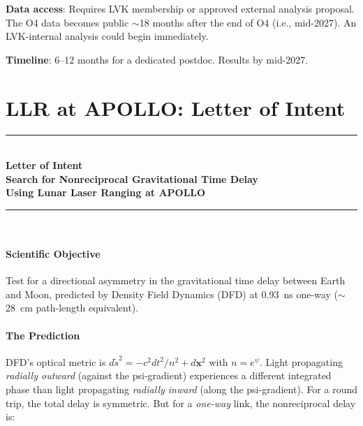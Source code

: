 \documentclass[11pt]{article}
\begin{document}
\textbf{Data access}: Requires LVK membership or approved external
analysis proposal. The O4 data becomes public $\sim$18 months
after the end of O4 (i.e., mid-2027). An LVK-internal analysis
could begin immediately.

\textbf{Timeline}: 6--12 months for a dedicated postdoc. Results
by mid-2027.


\part{LLR at APOLLO: Letter of Intent}
\label{part:llr}

\begin{center}
\rule{\textwidth}{1.5pt}\\[8pt]
{\large \textbf{Letter of Intent}}\\[4pt]
{\large \textbf{Search for Nonreciprocal Gravitational Time Delay}}\\[4pt]
{\large \textbf{Using Lunar Laser Ranging at APOLLO}}\\[8pt]
\rule{\textwidth}{1.5pt}\\[12pt]
\end{center}

\subsection*{Scientific Objective}

Test for a directional asymmetry in the gravitational time delay
between Earth and Moon, predicted by Density Field Dynamics (DFD)
at 0.93~ns one-way ($\sim$28~cm path-length equivalent).

\subsection*{The Prediction}

DFD's optical metric is $d\tilde{s}^2 = -c^2 dt^2/n^2 + d\mathbf{x}^2$
with $n = e^\psi$. Light propagating \emph{radially outward} (against
the psi-gradient) experiences a different integrated phase than light
propagating \emph{radially inward} (along the psi-gradient). For a
round trip, the total delay is symmetric. But for a \emph{one-way}
link, the nonreciprocal delay is:
\end{document}
